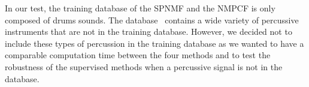 In our test, the training database of the SPNMF and the NMPCF is only composed of drums sounds. The database~\cite{bittner2014medleydb} contains a wide variety of percussive instruments that are not in the training database. However, we decided not to include these types of percussion in the training database as we wanted to have a comparable computation time between the four methods and to test the robustness of the supervised methods when a percussive signal is not in the database. 
